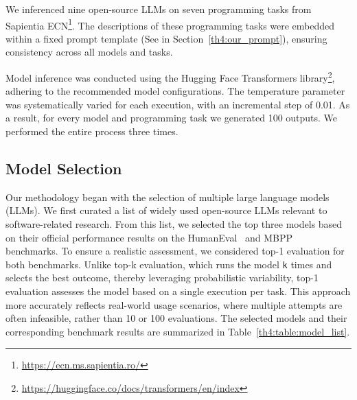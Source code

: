 We inferenced nine open-source LLMs on seven programming tasks from Sapientia ECN\footnote{\url{https://ecn.ms.sapientia.ro/}}. The descriptions of these programming tasks were embedded within a fixed prompt template (See in Section~\ref{th4:our_prompt}), ensuring consistency across all models and tasks.

Model inference was conducted using the Hugging Face Transformers library\footnote{\url{https://huggingface.co/docs/transformers/en/index}}, adhering to the recommended model configurations. The temperature parameter was systematically varied for each execution, with an incremental step of 0.01.
As a result, for every model and programming task we generated 100 outputs.
We performed the entire process three times.

\subsection{Model Selection}
\label{th4:section:model_selection}

Our methodology began with the selection of multiple large language models (LLMs).
We first curated a list of widely used open-source LLMs relevant to software-related research.
From this list, we selected the top three models based on their official performance results on the HumanEval~\cite{codex} and MBPP~\cite{mbpp} benchmarks.
To ensure a realistic assessment, we considered top-1 evaluation for both benchmarks.
Unlike top-k evaluation, which runs the model \texttt{k} times and selects the best outcome, thereby leveraging probabilistic variability, top-1 evaluation assesses the model based on a single execution per task.
This approach more accurately reflects real-world usage scenarios, where multiple attempts are often infeasible, rather than 10 or 100 evaluations.
The selected models and their corresponding benchmark results are summarized in Table~\ref{th4:table:model_list}.

